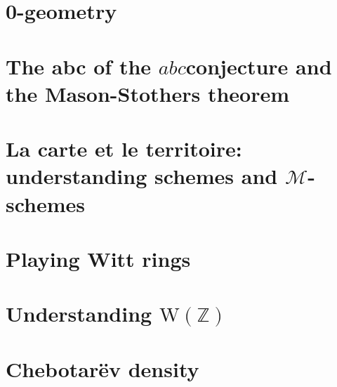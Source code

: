 \documentclass[a4paper]{memoir}
\begin{document}
\chapter{0-geometry}
\label{chapter:prep-notes}






\chapter{The abc of the \texorpdfstring{$abc$}-conjecture and the Mason-Stothers theorem}





\chapter{La carte et le territoire: understanding schemes and \texorpdfstring{$\mathcal{M}$}{M}-schemes}








\chapter{Playing Witt rings}





\chapter{Understanding \texorpdfstring{$\mathrm{W}(\mathbb{Z})$}{W(Z)}}






\chapter{Chebotar\"ev density}


\end{document}
